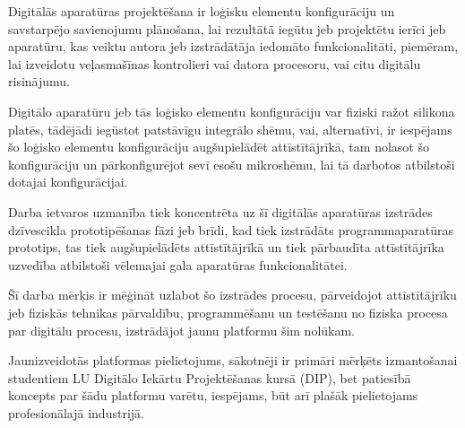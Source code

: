 Digitālās aparatūras projektēšana ir loģisku elementu konfigurāciju un savstarpējo savienojumu plānošana, lai
rezultātā iegūtu jeb projektētu ierīci jeb aparatūru, kas veiktu autora jeb izstrādātāja iedomāto funkcionalitāti, piemēram,
lai izveidotu veļasmašīnas kontrolieri vai datora procesoru, vai citu digitālu risinājumu.  
  
Digitālo aparatūru jeb tās loģisko elementu konfigurāciju var fiziski ražot silikona platēs, tādējādi iegūstot patstāvīgu integrālo
shēmu, vai, alternatīvi, ir iespējams šo loģisko elementu konfigurāciju augšupielādēt attīstītājrīkā, tam nolasot šo konfigurāciju un 
pārkonfigurējot sevī esošu  mikroshēmu, lai tā darbotos atbilstoši dotajai konfigurācijai.  

Darba ietvaros uzmanība tiek koncentrēta uz šī digitālās aparatūras izstrādes dzīvescikla prototipēšanas fāzi jeb brīdi, kad
tiek izstrādāts programmaparatūras prototips, tas tiek augšupielādēts attīstītājrīkā un tiek pārbaudīta attīstītājrīka uzvedība
atbilstoši vēlemajai gala aparatūras funkcionalitātei.

Šī darba mērķis ir mēģināt uzlabot šo izstrādes procesu, pārveidojot attīstītājrīku jeb fiziskās tehnikas pārvaldību, programmēšanu 
un testēšanu no fiziska procesa par digitālu procesu, izstrādājot jaunu platformu šim nolūkam.

Jaunizveidotās platformas pielietojums, sākotnēji ir primāri mērķēts izmantošanai studentiem LU Digitālo Iekārtu Projektēšanas kursā (DIP),
bet patiesībā koncepts par šādu platformu varētu, iespējams, būt arī plašāk pielietojams profesionālajā industrijā.
  